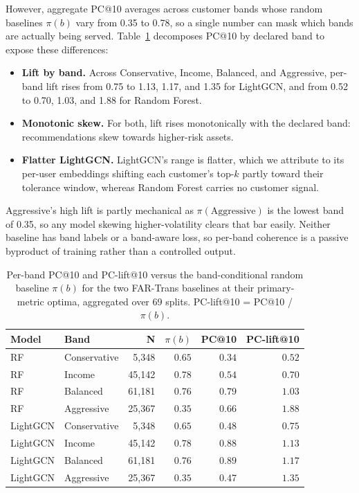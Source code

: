 However, aggregate PC@10 averages across customer bands whose random baselines $\pi(b)$ vary from 0.35 to 0.78, so a single number can mask which bands are actually being served. Table~\ref{tab:baseline-per-band} decomposes PC@10 by declared band to expose these differences:
\begin{itemize}
    \item \textbf{Lift by band.} Across Conservative, Income, Balanced, and Aggressive, per-band lift rises from 0.75 to 1.13, 1.17, and 1.35 for LightGCN, and from 0.52 to 0.70, 1.03, and 1.88 for Random Forest.
    \item \textbf{Monotonic skew.} For both, lift rises monotonically with the declared band: recommendations skew towards higher-risk assets.
    \item \textbf{Flatter LightGCN.} LightGCN's range is flatter, which we attribute to its per-user embeddings shifting each customer's top-$k$ partly toward their tolerance window, whereas Random Forest carries no customer signal.
\end{itemize}

Aggressive's high lift is partly mechanical as $\pi(\text{Aggressive})$ is the lowest band of 0.35, so any model skewing higher-volatility clears that bar easily. Neither baseline has band labels or a band-aware loss, so per-band coherence is a passive byproduct of training rather than a controlled output.

\begin{table}[H]
\centering
\footnotesize
\setlength{\tabcolsep}{4pt}
\begin{tabular}{llrrrr}
\toprule
Model & Band & N & $\pi(b)$ & PC@10 & PC-lift@10 \\
\midrule
RF       & Conservative & 5{,}348  & $0.65$ & $0.34$ & $0.52$ \\
RF       & Income       & 45{,}142 & $0.78$ & $0.54$ & $0.70$ \\
RF       & Balanced     & 61{,}181 & $0.76$ & $0.79$ & $1.03$ \\
RF       & Aggressive   & 25{,}367 & $0.35$ & $0.66$ & $1.88$ \\
\midrule
LightGCN & Conservative & 5{,}348  & $0.65$ & $0.48$ & $0.75$ \\
LightGCN & Income       & 45{,}142 & $0.78$ & $0.88$ & $1.13$ \\
LightGCN & Balanced     & 61{,}181 & $0.76$ & $0.89$ & $1.17$ \\
LightGCN & Aggressive   & 25{,}367 & $0.35$ & $0.47$ & $1.35$ \\
\bottomrule
\end{tabular}
\caption{Per-band PC@10 and PC-lift@10 versus the band-conditional random baseline $\pi(b)$ for the two FAR-Trans baselines at their primary-metric optima, aggregated over 69 splits. PC-lift@10 = PC@10 / $\pi(b)$.}
\label{tab:baseline-per-band}
\end{table}

